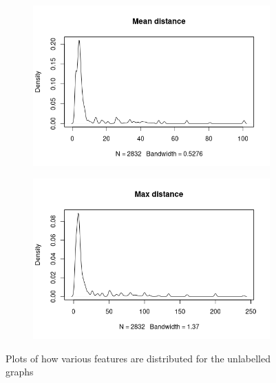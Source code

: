 \documentclass{article}
\theoremstyle{definition}
\theoremstyle{remark}
\begin{document}
\begin{figure}
\begin{subfigure}[t]{0.49\textwidth}
  \end{subfigure}
  \begin{subfigure}[t]{0.49\textwidth}
    \centering
    \includegraphics[width=\textwidth]{sip_meandist.png}
  \end{subfigure}
  \begin{subfigure}[t]{0.49\textwidth}
    \centering
    \includegraphics[width=\textwidth]{sip_maxdist.png}
  \end{subfigure}
  \caption{Plots of how various features are distributed for the unlabelled
    graphs}
  \label{fig:sip_features1}
\end{figure}
\end{document}
